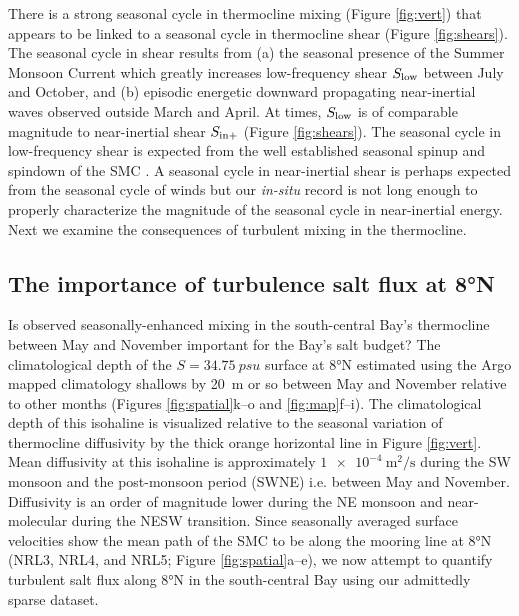 \documentclass[twocol]{ametsoc}
\begin{document}
There is a strong seasonal cycle in thermocline mixing (Figure \ref{fig:vert}) that appears to be linked to a seasonal cycle in thermocline shear (Figure \ref{fig:shears}).
The seasonal cycle in shear results from
(a) the seasonal presence of the Summer Monsoon Current which greatly increases low-frequency shear \(S_\text{low}\) between July and October, and
(b) episodic energetic downward propagating near-inertial waves observed outside March and April.
At times, \(S_\text{low}\) is of comparable magnitude to near-inertial shear \(S_\text{in+}\) (Figure \ref{fig:shears}).
The seasonal cycle in low-frequency shear is expected from the well established seasonal spinup and spindown of the SMC \citep{Schott2001a}.
A seasonal cycle in near-inertial shear is perhaps expected from the seasonal cycle of winds but our \emph{in-situ} record is not long enough to properly characterize the magnitude of the seasonal cycle in near-inertial energy.
Next we examine the consequences of turbulent mixing in the thermocline.

\subsection{The importance of turbulence salt flux at 8°N}
\label{sec:orgb4384c6}
\label{sec:js}

Is observed seasonally-enhanced mixing in the south-central Bay's thermocline between May and November
important for the Bay's salt budget?
The climatological depth of the \(S=\SI{34.75}{psu}\) surface at 8°N estimated using the Argo mapped climatology shallows by \SI{20}{m} or so between May and November relative to other months (Figures \ref{fig:spatial}k--o and \ref{fig:map}f--i).
The climatological depth of this isohaline is visualized relative to the seasonal variation of thermocline diffusivity by the thick orange horizontal line in Figure \ref{fig:vert}.
Mean diffusivity at this isohaline is approximately \(\SI{1e-4}{\m\squared\per\s}\) during the SW monsoon and the post-monsoon period (SWNE) i.e. between May and November.
Diffusivity is an order of magnitude lower during the NE monsoon and near-molecular during the NESW transition.
Since seasonally averaged surface velocities show the mean path of the SMC to be along the mooring line at 8°N (NRL3, NRL4, and NRL5; Figure \ref{fig:spatial}a--e), we now attempt to quantify turbulent salt flux along 8°N in the south-central Bay using our admittedly sparse dataset.
\end{document}
